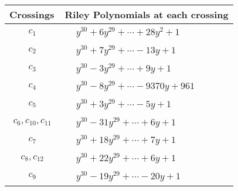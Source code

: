 \documentclass[1p]{elsarticle_modified}
\theoremstyle{definition}
\begin{document}
\begin{tabular}{m{50pt}|m{274pt}}
Crossings & \hspace{64pt}Riley Polynomials at each crossing \\
\hline $$\begin{aligned}c_{1}\end{aligned}$$&$\begin{aligned}
&y^{30}+6 y^{29}+\cdots+28 y^2+1
\end{aligned}$\\
\hline $$\begin{aligned}c_{2}\end{aligned}$$&$\begin{aligned}
&y^{30}+7 y^{29}+\cdots-13 y+1
\end{aligned}$\\
\hline $$\begin{aligned}c_{3}\end{aligned}$$&$\begin{aligned}
&y^{30}-3 y^{29}+\cdots+9 y+1
\end{aligned}$\\
\hline $$\begin{aligned}c_{4}\end{aligned}$$&$\begin{aligned}
&y^{30}-8 y^{29}+\cdots-9370 y+961
\end{aligned}$\\
\hline $$\begin{aligned}c_{5}\end{aligned}$$&$\begin{aligned}
&y^{30}+3 y^{29}+\cdots-5 y+1
\end{aligned}$\\
\hline $$\begin{aligned}c_{6},c_{10},c_{11}\end{aligned}$$&$\begin{aligned}
&y^{30}-31 y^{29}+\cdots+6 y+1
\end{aligned}$\\
\hline $$\begin{aligned}c_{7}\end{aligned}$$&$\begin{aligned}
&y^{30}+18 y^{29}+\cdots+7 y+1
\end{aligned}$\\
\hline $$\begin{aligned}c_{8},c_{12}\end{aligned}$$&$\begin{aligned}
&y^{30}+22 y^{29}+\cdots+6 y+1
\end{aligned}$\\
\hline $$\begin{aligned}c_{9}\end{aligned}$$&$\begin{aligned}
&y^{30}-19 y^{29}+\cdots-20 y+1
\end{aligned}$\\
\hline
\end{tabular}\\~\\
\end{document}

